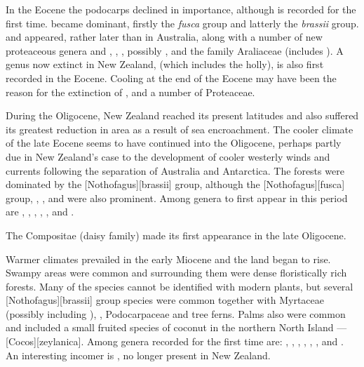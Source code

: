 In the Eocene the podocarps declined in importance, although  is recorded for the first time.  became dominant, firstly the \emph{fusca} group and latterly the \emph{brassii} group.  and  appeared, rather later than in Australia, along with a number of new proteaceous genera and , , , possibly , and the family Araliaceae (includes ).
A genus now extinct in New Zealand,  (which includes the holly), is also first recorded in the Eocene.
Cooling at the end of the Eocene may have been the reason for the extinction of ,  and a number of Proteaceae.

During the Oligocene, New Zealand reached its present latitudes and also suffered its greatest reduction in area as a result of sea encroachment.
The cooler climate of the late Eocene seems to have continued into the Oligocene, perhaps partly due in New Zealand's case to the development of cooler westerly winds and currents following the separation of Australia and Antarctica.
The forests were dominated by the [Nothofagus][brassii] group, although the [Nothofagus][fusca] group, , ,  and  were also prominent.
Among genera to first appear in this period are , , , , ,  and .

The Compositae (daisy family) made its first appearance in the late Oligocene.

Warmer climates prevailed in the early Miocene and the land began to rise.
Swampy areas were common and surrounding them were dense floristically rich forests.
Many of the species cannot be identified with modern plants, but several [Nothofagus][brassii] group species were common together with Myrtaceae (possibly including ), , Podocarpaceae and tree ferns.
Palms also were common and included a small fruited species of coconut in the northern North Island --- [Cocos][zeylanica].
Among genera recorded for the first time are: , , , , , ,  and .
An interesting incomer is , no longer present in New Zealand.

